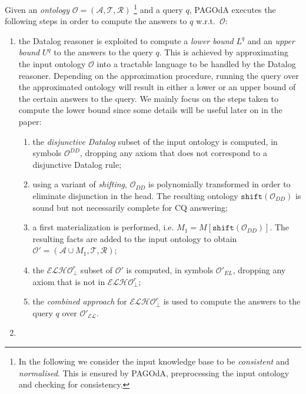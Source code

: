 \documentclass[runningheads]{llncs}
\newcommand{\elho}{$\mathcal{ELHO}^r_\bot$\xspace}
\newcommand{\pagoda}{\mbox{PAGOdA}\xspace}
\newcommand{\datalog}{\mbox{Datalog}\xspace}
\begin{document}
Given an \emph{ontology} $\mathcal{O} = (\mathcal{A}, \mathcal{T}, \mathcal{R})$
\footnote{
    In the following we consider the input knowledge base to be \emph{consistent} and \emph{normalised}.
    This is ensured by \pagoda, preprocessing the input ontology and checking for consistency.
}
and a query $q$, \pagoda executes the following steps in order to compute the answers to $q$ w.r.t.\ $\mathcal{O}$:
\begin{enumerate}
    \item
        the \datalog reasoner is exploited to compute a \emph{lower bound} $L^q$ and an \emph{upper bound} $U^q$ to the answers to the query $q$.
        This is achieved by approximating the input ontology $\mathcal{O}$ into a tractable language to be handled by the \datalog reasoner.
        Depending on the approximation procedure, running the query over the approximated ontology will result in either a lower or an upper bound of the certain answers to the query.
        We mainly focus on the steps taken to compute the lower bound since some details will be useful later on in the paper:
        \begin{enumerate}
            \item
                the \emph{disjunctive \datalog} subset of the input ontology is computed, in symbols $\mathcal{O}^{DD}$, dropping any axiom that does not correspond to a disjunctive \datalog rule;
            \item
                using a variant of \emph{shifting}\cite{eiter2004}, $\mathcal{O}_{DD}$ is polynomially transformed in order to eliminate disjunction in the head.
                The resulting ontology $\texttt{shift}(\mathcal{O}_{DD})$ is sound but not necessarily complete for CQ answering;
            \item
                a first materialization is performed, i.e. $M_1 = M[\texttt{shift}(\mathcal{O}_{DD})]$.
                The resulting facts are added to the input ontology to obtain $\mathcal{O}' = (\mathcal{A} \cup M_1, \mathcal{T}, \mathcal{R})$;
            \item
                the \elho\cite{stefanoni2014} subset of $\mathcal{O}'$ is computed, in symbols $\mathcal{O}'_{EL}$, dropping any axiom that is not in \elho;
            \item
                the \emph{combined approach} for \elho\cite{lutz2009,stefanoni2013} is used to compute the answers to the query $q$ over $\mathcal{O'_{EL}}$.
        \end{enumerate}
    \item

\end{enumerate}
\end{document}
